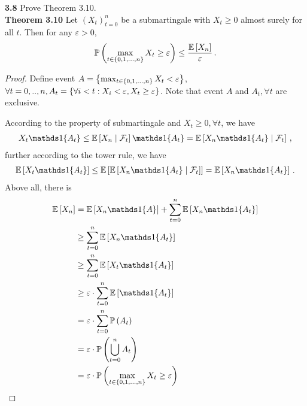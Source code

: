 \noindent\textbf{3.8} Prove Theorem 3.10.\\
\textbf{Theorem 3.10}
  Let $(X_t)_{t=0}^n$ be a submartingale with $X_t\ge 0$ almost surely for all $t$. Then for any $\varepsilon>0$,
  \begin{align*}
      \mathbb{P} \left(\max_{t\in\left\{ 0,1,...,n \right\}}X_t \ge \varepsilon\right) \le \frac{\mathbb{E} \left[X_n\right]}{\varepsilon}\,.
  \end{align*}

\begin{proof}
  Define event $A=\left\{ \max_{t\in\left\{ 0,1,...,n \right\}} X_t<\varepsilon  \right\}$, $\forall t=0,..,n, A_t=\left\{ \forall i<t: X_i<\varepsilon , X_t \ge \varepsilon \right\}$. Note that event $A$ and $A_t,\forall t$ are exclusive. 

  According to the property of submartingale and $X_t\ge 0, \forall t$, we have
  \begin{align*}
    X_t \bOne{A_t} \le \EE{X_n \mid \cF_{t}}  \bOne{A_t} = \EE{X_n \bOne{A_t}\mid \cF_{t}}  \,,
  \end{align*}
  further according to the tower rule, we have
  \begin{align*}
   \EE{X_t \bOne{A_t}} \le \EE{\EE{X_n \bOne{A_t}\mid \cF_{t}}}  = \EE{X_n \bOne{A_t}} \,.
  \end{align*}
  Above all, there is
  \begin{align}
     \EE{X_n} &= \EE{X_n\bOne{A}}+\sum_{t=0}^n\EE{X_n\bOne{A_t}} \notag \\
      &\ge \sum_{t=0}^n\EE{X_n\bOne{A_t}}\notag\\
      &\ge \sum_{t=0}^n\EE{X_t\bOne{A_t}}\notag\\
      &\ge \varepsilon\cdot \sum_{t=0}^n\EE{\bOne{A_t}}\notag\\
      &= \varepsilon\cdot \sum_{t=0}^n \PP{A_t} \notag\\
      &= \varepsilon \cdot\PP{\bigcup_{t=0}^n A_t}\notag\\
      &= \varepsilon\cdot \PP{\max_{t\in\set{0,1,...,n}}X_t \ge \varepsilon}\notag
  \end{align}
\end{proof}












